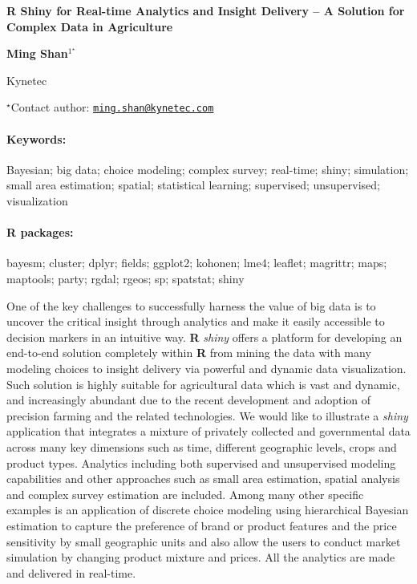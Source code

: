 \documentclass[11pt, a4paper]{article}
\renewcommand{\title}[1]{\begin{center}{\bf \LARGE #1}\end{center}}
\newcommand{\keywords}{\paragraph{Keywords:}}
\newcommand{\packages}{\paragraph{R packages:}}
\begin{document}
\pagestyle{empty}

\title{R Shiny for Real-time Analytics and Insight Delivery -- A Solution for
Complex Data in Agriculture}

\begin{center}
  {\bf Ming Shan$^{1^\star}$}
\end{center}

\vskip 0.3cm

\begin{affiliations}
\begin{enumerate}
\begin{minipage}{0.915\textwidth}
\centering
\item Kynetec \\[-2pt]
\end{minipage}
\end{enumerate}
$^\star$Contact author: \href{mailto:ming.shan@kynetec.com}{\nolinkurl{ming.shan@kynetec.com}}\\
\end{affiliations}

\vskip 0.5cm

\begin{minipage}{0.915\textwidth}
\keywords Bayesian; big data; choice modeling; complex survey; real-time; shiny;
simulation; small area estimation; spatial; statistical learning;
supervised; unsupervised; visualization
\packages bayesm; cluster; dplyr; fields; ggplot2; kohonen; lme4; leaflet;
magrittr; maps; maptools; party; rgdal; rgeos; sp; spatstat; shiny
\end{minipage}

\vskip 0.8cm

One of the key challenges to successfully harness the value of big data
is to uncover the critical insight through analytics and make it easily
accessible to decision markers in an intuitive way. \textbf{R}
\emph{shiny} offers a platform for developing an end-to-end solution
completely within \textbf{R} from mining the data with many modeling
choices to insight delivery via powerful and dynamic data visualization.
Such solution is highly suitable for agricultural data which is vast and
dynamic, and increasingly abundant due to the recent development and
adoption of precision farming and the related technologies. We would
like to illustrate a \emph{shiny} application that integrates a mixture
of privately collected and governmental data across many key dimensions
such as time, different geographic levels, crops and product types.
Analytics including both supervised and unsupervised modeling
capabilities and other approaches such as small area estimation, spatial
analysis and complex survey estimation are included. Among many other
specific examples is an application of discrete choice modeling using
hierarchical Bayesian estimation to capture the preference of brand or
product features and the price sensitivity by small geographic units and
also allow the users to conduct market simulation by changing product
mixture and prices. All the analytics are made and delivered in
real-time.
\end{document}
